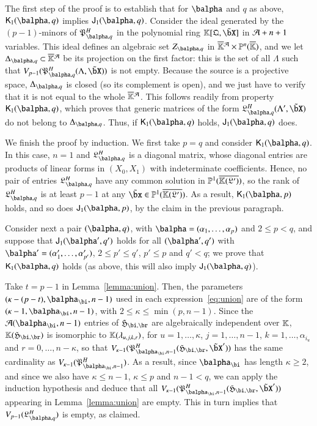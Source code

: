 \documentclass[amsthm]{elsart}
\begin{document}
The first step of the proof is to establish that for $\balpha$ and $q$
as above, $\assJ_1(\balpha,q)$ implies $\assI_1(\balpha,q)$. Consider
the ideal generated by the $(p-1)$-minors of
$\mathfrak{P}^H_{\balpha,q}$ in the polynomial ring
$\KK[\mathfrak{Q},\tilde\bX]$ in ${\cal A}+n+1$ variables. This ideal
defines an algebraic set $Z_{\balpha,q}$ in $\KKbar{}^{\cal A} \times
\P^n(\KKbar)$, and we let $\Delta_{\balpha,q} \subset \KKbar{}^{\cal
  A}$ be its projection on the first factor: this is the set of all
$\Lambda$ such that
$V_{p-1}(\mathfrak{P}^H_{\balpha,q}(\Lambda,\tilde\bX))$ is not
empty. Because the source is a projective space, $\Delta_{\balpha,q}$
is closed (so its complement is open), and we just have to verify that
it is not equal to the whole $\KKbar{}^{\cal A}$. This follows readily
from property $\assJ_1(\balpha,q)$, which proves that generic matrices
of the form $\mathfrak{L}^H_{\balpha,q}(\Lambda',\tilde\bX)$ do not
belong to $\Delta_{\balpha,q}$. Thus, if $\assJ_1(\balpha,q)$ holds, 
$\assI_1(\balpha,q)$ does.

We finish the proof by induction. We first take $p=q$ and consider
$\assJ_1(\balpha,q)$.  In this case, $n=1$ and
$\mathfrak{L}^H_{\balpha,q}$ is a diagonal matrix, whose diagonal
entries are products of linear forms in $(X_0,X_1)$ with indeterminate
coefficients. Hence, no pair of entries $\mathfrak{L}^H_{\balpha,q}$
have any common solution in $\mathbb{P}^1(\overline{\mathbb{K}(\mathfrak{L}')})$, so the rank of
$\mathfrak{L}^H_{\balpha,q}$ is at least $p-1$ at any $\tilde\bx \in
\P^1(\KKGpbar)$. As a result, $\assJ_1(\balpha,p)$ holds, and so does
$\assI_1(\balpha,p)$, by the claim in the previous paragraph.

Consider next a pair $(\balpha,q)$, with
$\balpha=(\alpha_1,\dots,\alpha_p)$ and $2 \le p < q$, and suppose
that $\assI_1(\balpha',q')$ holds for all $(\balpha',q')$ with
$\balpha'=(\alpha'_1,\dots,\alpha'_{p'})$, $2 \le p' \le q'$, $p' \le p$ and $q'
< q$; we prove that $\assJ_1(\balpha,q)$ holds (as above, this will
also imply $\assI_1(\balpha,q)$).

Take $t=p-1$ in Lemma~\ref{lemma:union}. Then, the parameters
$(\kappa-(p-t),\balpha_\bi,n-1)$ used in each
expression~\eqref{eq:union} are of the form
$(\kappa-1,\balpha_\bi,n-1)$, with $2 \le \kappa \le \min(p,n-1)$.
Since the ${\cal A}(\balpha_\bi,n-1)$ entries of $\mathfrak{H}_{\bi,\br}$ are algebraically
independent over $\mathbb{K}$, $\KK(\mathfrak{H}_{\bi,\br})$ is isomorphic to 
$\mathbb{K}(\lambda_{u,j,k,r})$, for $u=1,\dots,\kappa$, 
$j=1,\dots,n-1$, $k=1,\dots,\alpha_{i_u}$ 
and $r=0,\dots,n-\kappa$, so that $V_{\kappa-1}(\mathfrak{P}^H_{\balpha_\bi,n-1}(\mathfrak{H}_{\bi,\br},\tilde\bX'))$
has the same cardinality as 
$V_{\kappa-1}(\mathfrak{P}^H_{\balpha_\bi,n-1})$.
As a result, since $\balpha_\bi$ has length $\kappa\ge 2$, and since we also
have $\kappa \le n-1$, $\kappa \le p$ and $n-1 < q$, we can apply the
induction hypothesis and deduce that all
$V_{\kappa-1}(\mathfrak{P}^H_{\balpha_\bi,n-1}(\mathfrak{H}_{\bi,\br},\tilde\bX'))$ appearing
in Lemma~\ref{lemma:union} are empty. This in turn implies that
$V_{p-1}(\mathfrak{L}^H_{\balpha,q})$ is empty, as claimed.
\end{document}
